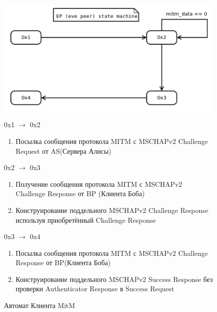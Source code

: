 \documentclass{extarticle}
\begin{document}
\begin{figure}
  \centering
  \includegraphics[scale=0.5]{res/eve-peer-mitm-state-machine-diagram.png}

  0x1 $\rightarrow$ 0x2
  \begin{enumerate}
    \item Посылка сообщения протокола MITM с MSCHAPv2 Challenge
      Request от AS(Сервера Алисы)
  \end{enumerate}

  0x2 $\rightarrow$ 0x3
  \begin{enumerate}
    \item Получение сообщения протокола MITM с MSCHAPv2 Challenge
      Response от BP (Клиента Боба)
    \item Конструирование поддельного MSCHAPv2 Challenge
      Response используя приобретённый Challenge Response
  \end{enumerate}

  0x3 $\rightarrow$ 0x4
  \begin{enumerate}
    \item Посылка сообщения протокола MITM с MSCHAPv2 Challenge
      Response от BP(Клиента Боба)
    \item Конструирование поддельного MSCHAPv2 Success
      Response без проверки Authenticator Response в Success Request
  \end{enumerate}
  \caption{Автомат Клиента MitM}
\end{figure}
\end{document}
